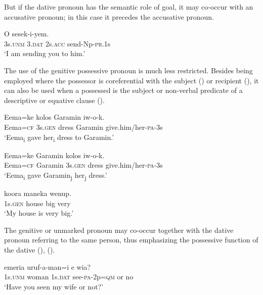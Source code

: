 But if the dative pronoun has the semantic role of goal, it may co-occur with an accusative pronoun; in this case it precedes the accusative pronoun.

\ea%
\label{ex:x1576}
\gll O   sesek-i-yem. \\
3s.\textsc{unm} 3.\textsc{dat} 2s.\textsc{acc} send-Np-\textsc{pr}.1s\\
\glt`I am sending you to him.'
\z

The use of the genitive possessive pronoun is much less restricted. Besides being employed where the possessor is coreferential with the subject () or recipient (), it can also be used when a possessed  is the subject or non-verbal predicate of a descriptive or equative clause (). 

\ea%
\label{ex:x589}
\gll Eema=ke  kolos Garamin iw-o-k. \\
Eema=\textsc{cf} 3s.\textsc{gen} dress Garamin give.him/her-\textsc{pa}-3s\\
\glt`Eema\textsubscript{i} gave her\textsubscript{i} dress to Garamin.'
\z

\ea%
\label{ex:x590}
\gll Eema=ke Garamin  kolos iw-o-k. \\
Eema=\textsc{cf} Garamin 3s.\textsc{gen} dress give.him/her-\textsc{pa}-3s\\
\glt`Eema\textsubscript{i} gave Garamin\textsubscript{j} her\textsubscript{j} dress.'
\z

\ea%
\label{ex:x591}
\gll {} koora maneka wenup. \\
1s.\textsc{gen} house big very\\
\glt`My house is very big.'
\z

The genitive or unmarked pronoun may co-occur together with the dative pronoun referring to the same person, thus emphasizing the possessive function of the dative (), ().

\ea%
\label{ex:x1863}
\gll {} emeria  uruf-a-man=i e wia? \\
1s.\textsc{unm} woman 1s.\textsc{dat} see-\textsc{pa}-2p=\textsc{qm} or no\\
\glt`Have you seen my wife or not?'
\z

